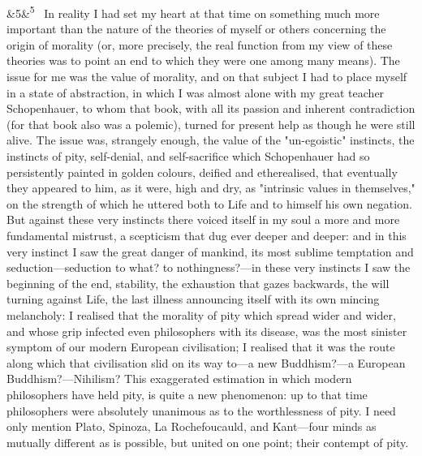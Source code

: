 \documentclass[12pt]{article}
\newcommand{\para}[1][]{\par\noindent\ifx&#1&\else\textsuperscript{\footnotesize #1}~\fi}
\begin{document}
\para[5] In reality I had set my heart at that time on something much more important than the nature of the theories of myself or others concerning the origin of morality (or, more precisely, the real function from my view of these theories was to point an end to which they were one among many means). The issue for me was the value of morality, and on that subject I had to place myself in a state of abstraction, in which I was almost alone with my great teacher Schopenhauer, to whom that book, with all its passion and inherent contradiction (for that book also was a polemic), turned for present help as though he were still alive. The issue was, strangely enough, the value of the "un-egoistic" instincts, the instincts of pity, self-denial, and self-sacrifice which Schopenhauer had so persistently painted in golden colours, deified and etherealised, that eventually they appeared to him, as it were, high and dry, as "intrinsic values in themselves," on the strength of which he uttered both to Life and to himself his own negation. But against these very instincts there voiced itself in my soul a more and more fundamental mistrust, a scepticism that dug ever deeper and deeper: and in this very instinct I saw the great danger of mankind, its most sublime temptation and seduction---seduction to what? to nothingness?---in these very instincts I saw the beginning of the end, stability, the exhaustion that gazes backwards, the will turning against Life, the last illness announcing itself with its own mincing melancholy: I realised that the morality of pity which spread wider and wider, and whose grip infected even philosophers with its disease, was the most sinister symptom of our modern European civilisation; I realised that it was the route along which that civilisation slid on its way to---a new Buddhism?---a European Buddhism?---Nihilism? This exaggerated estimation in which modern philosophers have held pity, is quite a new phenomenon: up to that time philosophers were absolutely unanimous as to the worthlessness of pity. I need only mention Plato, Spinoza, La Rochefoucauld, and Kant---four minds as mutually different as is possible, but united on one point; their contempt of pity.
\end{document}
